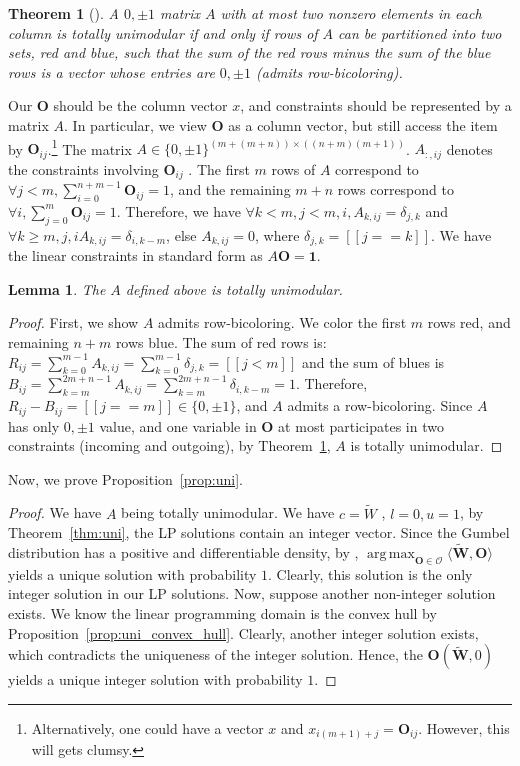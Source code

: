 \documentclass[11pt]{article}
\DeclareMathOperator*{\argmax}{arg\,max}
\newtheorem{theorem}{Theorem}
\newtheorem{lemma}{Lemma}
\begin{document}
\begin{theorem}[]\label{tm:bi}
A $0,\pm1$ matrix $A$ with at most two nonzero elements in
each column is totally unimodular if and only if rows of $A$ can be partitioned into two sets, red and blue, such that the sum of the red rows minus the sum of the blue rows is a vector whose entries are $0,\pm1$ (admits row-bicoloring).
\end{theorem}
Our $ \mathbf{O} $ should be the column vector $x$, and constraints should be represented by a matrix $A$. In particular, we view $  \mathbf{O}  $ as a column vector, but still access the item by $\mathbf{O}_{ij}$.\footnote{Alternatively, one could have a  vector $x $ and $x_{ i(m+1)+j} = \mathbf{O}_{ij} $. However, this will gets clumsy.} The matrix $A \in \{0,\pm 1\}^{(m+ (m+n)) \times ((n+m) (m+1))}$. $A_{:,ij}$ denotes the constraints involving $\mathbf{O}_{ij}$ . The first $m$ rows of $A$ correspond to $  \forall  j < m, \sum_{i=0}^{n+m-1} \mathbf{O}_{ij} =1 $, and the remaining $m+n$ rows correspond to $\forall i, \sum_{j=0}^{m} \mathbf{O}_{ij} =1 $. Therefore, we have $\forall k <m , j < m , i, A_{k,ij}= \delta_{j,k}$ and $\forall k\geq m , j  , i A_{k,ij}=  \delta_{i,k-m}$, else $A_{k,ij}= 0$, where $ \delta_{j,k} = [[j==k]]$. We have the linear constraints in standard form as $A\mathbf{O} = \mathbf{1}$.
\begin{lemma}
The $A$ defined above is totally unimodular.
\end{lemma}
\begin{proof}
First, we show $A$ admits row-bicoloring. We color the first $m$ rows red, and remaining $n+m$ rows blue. The sum of red rows is: $R_{ij}=\sum_{k=0 }^{m-1} A_{k,ij} =\sum_{k=0 }^{m-1}\delta_{j,k}= [[j<m]] $ and the sum of blues is $B_{ij}=\sum_{k=m }^{2m+n-1} A_{k,ij}= \sum_{k=m }^{2m+n-1} \delta_{i,k-m} = 1$. Therefore,  $R_{ij} - B_{ij} = [[j==m]] \in \{0,\pm1\}$, and $A$ admits a row-bicoloring. Since $A$ has only $0,\pm 1$ value, and one variable in $\mathbf{O}$ at most participates in two constraints (incoming and outgoing), by Theorem~\ref{tm:bi}, $A$ is totally unimodular. 
\end{proof}
Now, we prove Proposition~\ref{prop:uni}.
\begin{proof} \label{prof:uni}
We have $A$ being totally unimodular. We have  $c=\widetilde{W}$ , $l=0,u=1$, by Theorem~\ref{thm:uni}, the LP solutions contain an integer vector. Since the Gumbel distribution has a positive and differentiable density,  by \cite[Proposition~3]{Paulus2020GradientEW},  $ \argmax_{  \mathbf{O} \in \mathcal{O}} \langle \widetilde{ \mathbf{W}}, \mathbf{O} \rangle $  yields a unique solution with probability $1$. Clearly, this solution is the only integer solution in our LP solutions. Now, suppose another non-integer solution exists. We know the linear programming domain is the convex hull by Proposition~\ref{prop:uni_convex_hull}. Clearly, another integer solution exists, which contradicts the uniqueness of the integer solution. Hence, the  $\mathbf{O}( \widetilde{ \mathbf{W}},0)$ yields a unique integer solution with probability $1$.
\end{proof}
\end{document}
